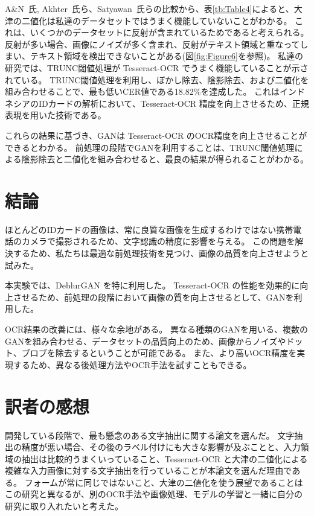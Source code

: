 \documentclass[uplatex, twocolumn,10pt]{jsarticle}
\begin{document}
A\&N~\cite{bib12}氏, Akhter~\cite{bib12}氏ら、Satyawan~\cite{bib4}氏らの比較から、表\ref{tb:Table4}によると、大津の二値化は私達のデータセットではうまく機能していないことがわかる。
これは、いくつかのデータセットに反射が含まれているためであると考えられる。
反射が多い場合、画像にノイズが多く含まれ、反射がテキスト領域と重なってしまい、テキスト領域を検出できないことがある(図\ref{fig:Figure6}を参照)。
私達の研究では、TRUNC閾値処理が Tesseract-OCR でうまく機能していることが示されている。
TRUNC閾値処理を利用し、ぼかし除去、陰影除去、および二値化を組み合わせることで、最も低いCER値である18.82\%を達成した。
これはインドネシアのIDカードの解析において、Tesseract-OCR 精度を向上させるため、正規表現を用いた技術である。

これらの結果に基づき、GANは Tesseract-OCR のOCR精度を向上させることができるとわかる。
前処理の段階でGANを利用することは、TRUNC閾値処理による陰影除去と二値化を組み合わせると、最良の結果が得られることがわかる。



\section{結論}

ほとんどのIDカードの画像は、常に良質な画像を生成するわけではない携帯電話のカメラで撮影されるため、文字認識の精度に影響を与える。
この問題を解決するため、私たちは最適な前処理技術を見つけ、画像の品質を向上させようと試みた。

本実験では、DeblurGAN を特に利用した。
Tesseract-OCR の性能を効果的に向上させるため、前処理の段階において画像の質を向上させるとして、GANを利用した。

OCR結果の改善には、様々な余地がある。
異なる種類のGANを用いる、複数のGANを組み合わせる、データセットの品質向上のため、画像からノイズやドット、ブロブを除去するということが可能である。
また、より高いOCR精度を実現するため、異なる後処理方法やOCR手法を試すこともできる。




\section{訳者の感想}
開発している段階で、最も懸念のある文字抽出に関する論文を選んだ。
文字抽出の精度が悪い場合、その後のラベル付けにも大きな影響が及ぶことと、入力領域の抽出は比較的うまくいっていること、Tesseract-OCR と大津の二値化による複雑な入力画像に対する文字抽出を行っていることが本論文を選んだ理由である。
フォームが常に同じではないこと、大津の二値化を使う展望であることはこの研究と異なるが、別のOCR手法や画像処理、モデルの学習と一緒に自分の研究に取り入れたいと考えた。
\end{document}
